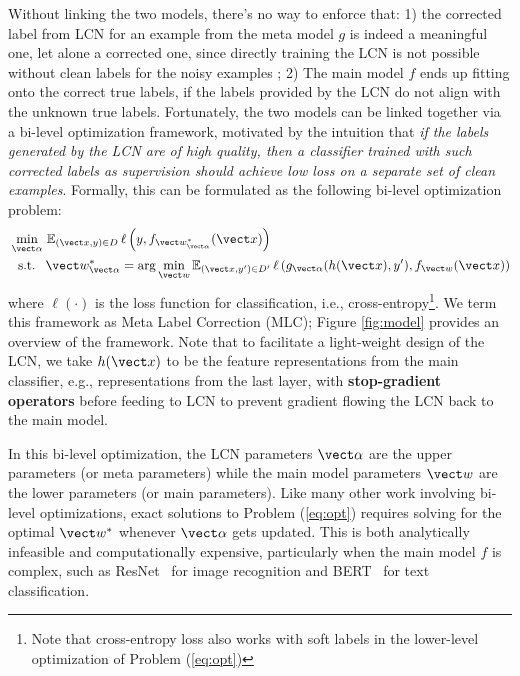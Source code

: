 Without linking the two models, there's no way to enforce that: 1) the
corrected label from LCN for an example from the meta model $g$ is
indeed a meaningful one, let alone a corrected one, since directly
training the LCN is not possible without clean labels for the noisy
examples ; 2) The main model $f$ ends up fitting onto the correct true
labels, if the labels provided by the LCN do not align with the
unknown true labels. Fortunately, the two models can be linked
together via a bi-level optimization framework, motivated by the
intuition that \textit{if the labels generated by the LCN are of high
  quality, then a classifier trained with such corrected labels as
  supervision should achieve low loss on a separate set of clean
  examples}. Formally, this can be formulated as the following bi-level optimization problem:
\begin{align}
  \label{eq:opt}
  &\min_{\vect\alpha}\,\mathbb{E}_{(\vect x, y)\in D}\,\ell\left(y,f_{\vect w^*_{\vect \alpha}}(\vect x)\right)\\
  &
  \,\,\,\,\mbox{s.t. }\,\,\vect w^*_{\vect \alpha}=\arg\min_{\vect w}\mathbb{E}_{(\vect x, y')\in D'}\,\ell\left(g_{\vect \alpha}(h(\vect x), y'), f_{\vect w}(\vect x)\right)\nonumber
\end{align}
where $\ell(\cdot)$ is the loss function for classification, i.e.,
cross-entropy\footnote{Note that cross-entropy loss also works with
  soft labels in the lower-level optimization of Problem
  (\ref{eq:opt})}. We term this framework as Meta Label Correction
(MLC); Figure \ref{fig:model} provides an overview of the
framework. Note that to facilitate a light-weight design of the LCN,
we take $h(\vect x)$ to be the feature representations from the main
classifier, e.g., representations from the last layer, with
\textbf{stop-gradient operators} before feeding to LCN to prevent
gradient flowing the LCN back to the main model.

In this bi-level optimization, the LCN parameters $\vect \alpha$ are
the upper parameters (or meta parameters) while the main model
parameters $\vect w$ are the lower parameters (or main
parameters). Like many other work involving bi-level optimizations,
exact solutions to Problem (\ref{eq:opt}) requires solving for the
optimal $\vect w^*$ whenever $\vect \alpha$ gets updated. This is
 both analytically infeasible and computationally expensive,
particularly when the main model $f$ is complex, such as
ResNet~\cite{he2016deep} for image recognition and
BERT~\cite{devlin2018bert} for text classification.

